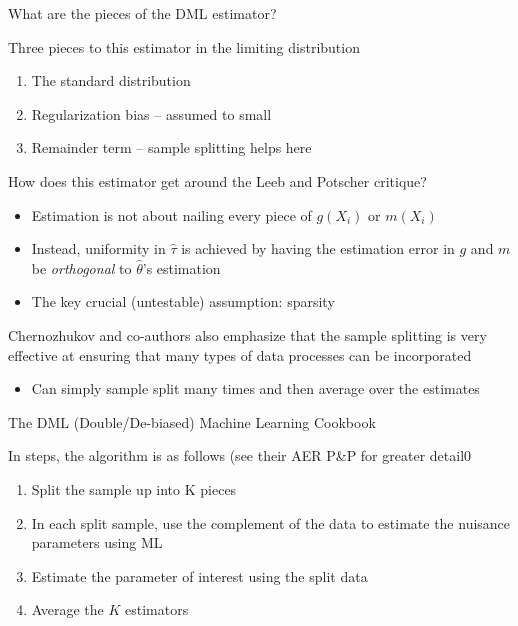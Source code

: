 \documentclass[notes,11pt, aspectratio=169]{beamer}
\newenvironment{wideitemize}{\itemize\addtolength{\itemsep}{10pt}}{\enditemize}
\begin{document}
\begin{frame}{What are the pieces of the DML estimator?}
  \begin{wideitemize}
  \item Three pieces to this estimator in the limiting distribution
    \begin{enumerate}
    \item The standard distribution
    \item Regularization bias -- assumed to small
    \item Remainder term -- sample splitting helps here
    \end{enumerate}
  \item How does this estimator get around the Leeb and Potscher critique?
    \begin{itemize}
    \item Estimation is not about nailing every piece of $g(X_{i})$ or $m(X_{i})$
    \item Instead, uniformity in $\hat{\tau}$ is achieved by having
      the estimation error in $g$ and $m$ be \emph{orthogonal} to
      $\hat{\theta}$'s estimation
    \item The key crucial (untestable) assumption: sparsity
    \end{itemize}
  \item Chernozhukov and co-authors also emphasize that the sample
    splitting is very effective at ensuring that many types of data
    processes can be incorporated
    \begin{itemize}
    \item Can simply sample split many times and then average over the
      estimates
    \end{itemize}
\end{wideitemize}
\end{frame}
\begin{frame}{The DML (Double/De-biased) Machine Learning Cookbook}
  \begin{wideitemize}
  \item In steps, the algorithm is as follows (see their AER P\&P for greater detail0
    \begin{enumerate}
    \item Split the sample up into K pieces
    \item In each split sample, use the complement of the data to estimate the nuisance parameters using ML
    \item Estimate the parameter of interest using the split data
    \item Average the $K$ estimators
    \end{enumerate}
  \end{wideitemize}
\end{frame}
\end{document}
